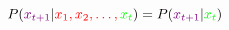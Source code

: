 \documentclass[]{standalone}
\begin{document}
 ${P(\color{violet}x_{t+1}\color{black}\vert \color{red}x_1, x_2, \color{red}\ldots , \color{green}x_t\color{black}) = P(\color{violet}x_{t+1}\color{black} \vert \color{green}x_t\color{black})}$
\end{document}
